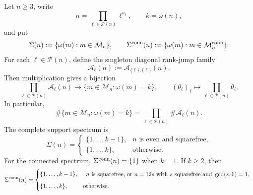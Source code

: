 \begin{theorem}
\label{thm:exact-support-spectra}
Let $n\ge3$, write
\[
 n=\prod_{\ell\in\mathcal P(n)}\ell^{a_\ell},
 \qquad k=\omega(n),
\]
and put
\[
 \Sigma(n):=\{\omega(m):m\in\mathcal M_n\},\qquad
 \Sigma^{\rm conn}(n):=\{\omega(m):m\in\mathcal M_n^{\rm conn}\}.
\]
For each $\ell\in\mathcal P(n)$, define the singleton diagonal rank-jump family
\[
 \mathcal A_\ell(n):=
 \mathcal A_{\{\ell\},\{\ell\}}(n).
\]
Then multiplication gives a bijection
\begin{equation}\label{eq:extremal-support-product-bijection}
 \prod_{\ell\in\mathcal P(n)}\mathcal A_\ell(n)
 \longrightarrow
 \{m\in\mathcal M_n:\omega(m)=k\},
 \qquad (\theta_\ell)_\ell\longmapsto
 \prod_{\ell\in\mathcal P(n)}\theta_\ell.
\end{equation}
In particular,
\begin{equation}\label{eq:extremal-support-product-count}
 \#\{m\in\mathcal M_n:\omega(m)=k\}
 =\prod_{\ell\in\mathcal P(n)}\#\mathcal A_\ell(n).
\end{equation}
The complete support spectrum is
\begin{equation}\label{eq:exact-total-support-spectrum}
 \Sigma(n)=
 \begin{cases}
  \{1,\ldots,k-1\},&n\text{ is even and squarefree},\\
  \{1,\ldots,k\},&\text{otherwise}.
 \end{cases}
\end{equation}
For the connected spectrum, $\Sigma^{\rm conn}(n)=\{1\}$ when $k=1$.
If $k\ge2$, then
\begin{equation}\label{eq:exact-connected-support-spectrum}
 \Sigma^{\rm conn}(n)=
 \begin{cases}
  \{1,\ldots,k-1\},
   &\begin{array}{l}
     n\text{ is squarefree, or }n=12s\text{ with }s\text{ squarefree}\
     \text{and }\gcd(s,6)=1,
    \end{array}\\[2mm]
  \{1,\ldots,k\},&\text{otherwise}.
 \end{cases}
\end{equation}
\end{theorem}

